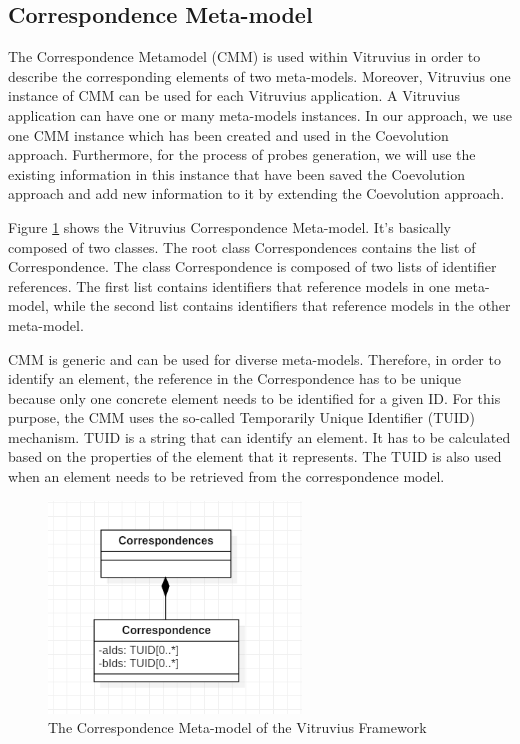 \subsection{Correspondence Meta-model}
\label{sec:Correspondence Meta-model}
The Correspondence Metamodel (CMM) is used within Vitruvius in order to describe the corresponding elements of two meta-models. Moreover, Vitruvius one instance of CMM can be used for each Vitruvius application. A Vitruvius application can have one or many meta-models instances.  In our approach, we use one CMM instance which has been created and used in the Coevolution approach. Furthermore, for the process of probes generation, we will use the existing information in this instance that have been saved the Coevolution approach and add new information to it by extending the Coevolution approach.

Figure \ref{fig:correspondence_model} shows the Vitruvius Correspondence Meta-model. It's basically composed of two classes. The root class Correspondences contains the list of Correspondence. The class Correspondence is composed of two lists of identifier references. The first list contains identifiers that reference models in one meta-model, while the second list contains identifiers that reference models in the other meta-model.

CMM is generic and can be used for diverse meta-models. Therefore, in order to identify an element, the reference in the Correspondence has to be unique because only one concrete element needs to be identified for a given ID. For this purpose, the CMM uses the so-called Temporarily Unique Identifier (TUID) mechanism. TUID is a string that can identify an element. It has to be calculated based on the properties of the element that it represents. The TUID is also used when an element needs to be retrieved from the correspondence model.    

\begin{figure}[h]
\centering
\includegraphics[width=0.6\textwidth]{figures/correspondence_model}
\caption{The Correspondence Meta-model of the Vitruvius Framework}
\label{fig:correspondence_model}
\end{figure} 

